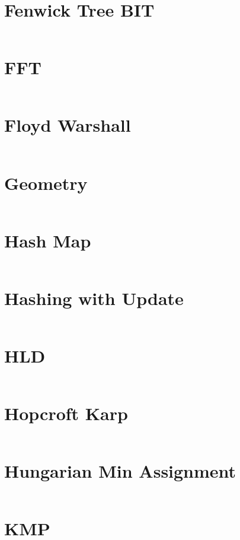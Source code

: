 \documentclass[10pt,a4paper,landscape]{article}
\begin{document}
\begin{multicols*}{3}
		
		\section{Fenwick Tree BIT}
		\inputminted{cpp}{codes/FENWICK_TREE_BIT.cpp}
		
		\section{FFT}
		\inputminted{cpp}{codes/FFT.cpp}
		
		\section{Floyd Warshall}
		\inputminted{cpp}{codes/FLOYD_WARSHALL.cpp}
		
		\section{Geometry}
		\inputminted{cpp}{codes/GEOMETRY.cpp}
		
		\section{Hash Map}
		\inputminted{cpp}{codes/HASH_MAP.cpp}
		
		\section{Hashing with Update}
		\inputminted{cpp}{codes/HASHING_WITH_UPDATE.cpp}
		
		\section{HLD}
		\inputminted{cpp}{codes/HLD.cpp}
		
		\section{Hopcroft Karp}
		\inputminted{cpp}{codes/HOPCROFT_KARP.cpp}
		
		\section{Hungarian Min Assignment}
		\inputminted{cpp}{codes/HUNGARIAN_MIN_ASSIGNMENT.cpp}
		
		\section{KMP}
		\inputminted{cpp}{codes/KMP.cpp}


\end{multicols*}
\end{document}
